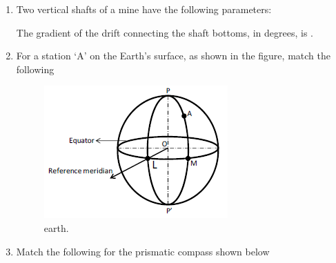 \documentclass[journal]{IEEEtran}
\begin{document}
\begin{enumerate}
\item Two vertical shafts of a mine have the following parameters:

\begin{center}
\renewcommand{\arraystretch}{1.2}

\end{center}

The gradient of the drift connecting the shaft bottoms, in degrees, is \underline{\hspace{2cm}}.
\hfill{}

\item For a station `A' on the Earth's surface, as shown in the figure, match the following

\begin{figure}[h!]
    \centering
    \includegraphics[width=0.35\linewidth]{figs/earth.png}
    \caption{earth.}
    \label{fig:earth}
\end{figure}

\begin{center}
\begin{minipage}{0.45\linewidth}
\centering
\renewcommand{\arraystretch}{1.2}

\end{minipage}\hfill
\begin{minipage}{0.45\linewidth}
\centering
\renewcommand{\arraystretch}{1.2}

\end{minipage}
\end{center}

\begin{enumerate}
\end{enumerate}
\hfill{}

\item Match the following for the prismatic compass shown below


\end{enumerate}
\end{document}
